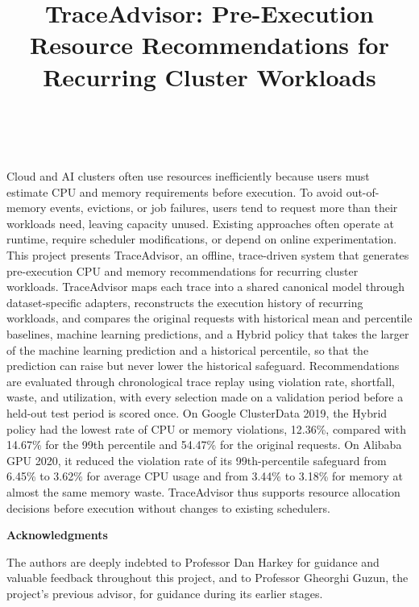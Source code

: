 \documentclass{IEEEtran}
\begin{document}
\noindent Cloud and AI clusters often use resources inefficiently because users must estimate CPU and memory requirements before execution. To avoid out-of-memory events, evictions, or job failures, users tend to request more than their workloads need, leaving capacity unused. Existing approaches often operate at runtime, require scheduler modifications, or depend on online experimentation. This project presents TraceAdvisor, an offline, trace-driven system that generates pre-execution CPU and memory recommendations for recurring cluster workloads. TraceAdvisor maps each trace into a shared canonical model through dataset-specific adapters, reconstructs the execution history of recurring workloads, and compares the original requests with historical mean and percentile baselines, machine learning predictions, and a Hybrid policy that takes the larger of the machine learning prediction and a historical percentile, so that the prediction can raise but never lower the historical safeguard. Recommendations are evaluated through chronological trace replay using violation rate, shortfall, waste, and utilization, with every selection made on a validation period before a held-out test period is scored once. On Google ClusterData 2019, the Hybrid policy had the lowest rate of CPU or memory violations, 12.36\%, compared with 14.67\% for the 99th percentile and 54.47\% for the original requests. On Alibaba GPU 2020, it reduced the violation rate of its 99th-percentile safeguard from 6.45\% to 3.62\% for average CPU usage and from 3.44\% to 3.18\% for memory at almost the same memory waste. TraceAdvisor thus supports resource allocation decisions before execution without changes to existing schedulers.
\newpage
\begin{center}
{\large\bfseries Acknowledgments}
\end{center}
\vspace{1em}
\noindent The authors are deeply indebted to Professor Dan Harkey for guidance and valuable feedback throughout this project, and to Professor Gheorghi Guzun, the project's previous advisor, for guidance during its earlier stages.
\newpage
\tableofcontents
\newpage
\listoffigures
\newpage
\listoftables
\newpage
\twocolumn
{}
\title{TraceAdvisor: Pre-Execution Resource Recommendations for Recurring Cluster Workloads}
\author{\\
}
\maketitle
\end{document}
